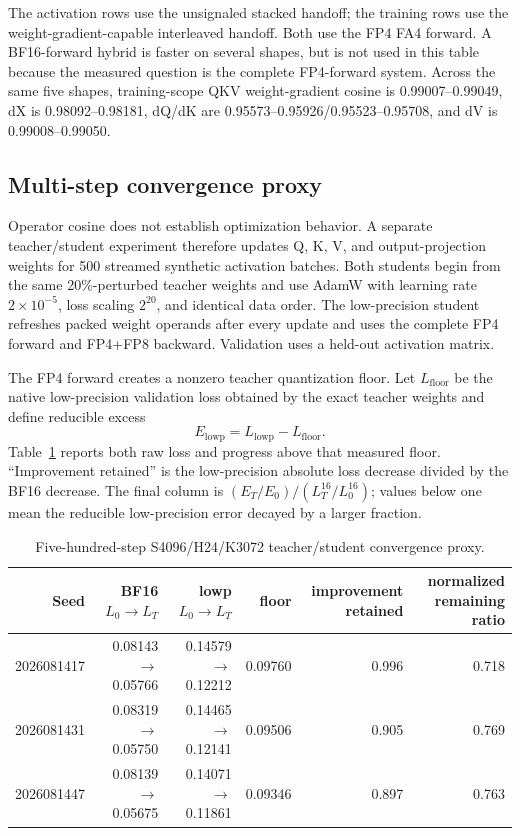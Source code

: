 The activation rows use the unsignaled stacked handoff; the training rows use
the weight-gradient-capable interleaved handoff.  Both use the FP4 FA4
forward.  A BF16-forward hybrid is faster on several shapes, but is not used
in this table because the measured question is the complete FP4-forward
system.  Across the same five shapes, training-scope QKV weight-gradient
cosine is 0.99007--0.99049, dX is 0.98092--0.98181, dQ/dK are
0.95573--0.95926/0.95523--0.95708, and dV is 0.99008--0.99050.

\subsection{Multi-step convergence proxy}

Operator cosine does not establish optimization behavior.  A separate
teacher/student experiment therefore updates Q, K, V, and output-projection
weights for 500 streamed synthetic activation batches.  Both students begin
from the same 20\%-perturbed teacher weights and use AdamW with learning rate
$2\times10^{-5}$, loss scaling $2^{20}$, and identical data order.  The
low-precision student refreshes packed weight operands after every update and
uses the complete FP4 forward and FP4+FP8 backward.  Validation uses a held-out
activation matrix.

The FP4 forward creates a nonzero teacher quantization floor.  Let
$L_{\mathrm{floor}}$ be the native low-precision validation loss obtained by
the exact teacher weights and define reducible excess
\begin{equation}
  E_{\mathrm{lowp}}=L_{\mathrm{lowp}}-L_{\mathrm{floor}}.
  \label{eq:lowp-excess-loss}
\end{equation}
Table~\ref{tab:convergence-proxy} reports both raw loss and progress above that
measured floor.  ``Improvement retained'' is the low-precision absolute loss
decrease divided by the BF16 decrease.  The final column is
$(E_T/E_0)/(L^{16}_T/L^{16}_0)$; values below one mean the reducible
low-precision error decayed by a larger fraction.

\begin{table}[htbp]
\centering
\caption{Five-hundred-step S4096/H24/K3072 teacher/student convergence proxy.}
\label{tab:convergence-proxy}
\scriptsize
\begin{tabular}{r rrrrr}
\toprule
Seed & BF16 $L_0\to L_T$ & lowp $L_0\to L_T$ & floor & improvement retained & normalized remaining ratio \\
\midrule
2026081417 & 0.08143 $\to$ 0.05766 & 0.14579 $\to$ 0.12212 & 0.09760 & 0.996 & 0.718 \\
2026081431 & 0.08319 $\to$ 0.05750 & 0.14465 $\to$ 0.12141 & 0.09506 & 0.905 & 0.769 \\
2026081447 & 0.08139 $\to$ 0.05675 & 0.14071 $\to$ 0.11861 & 0.09346 & 0.897 & 0.763 \\
\bottomrule
\end{tabular}
\end{table}

